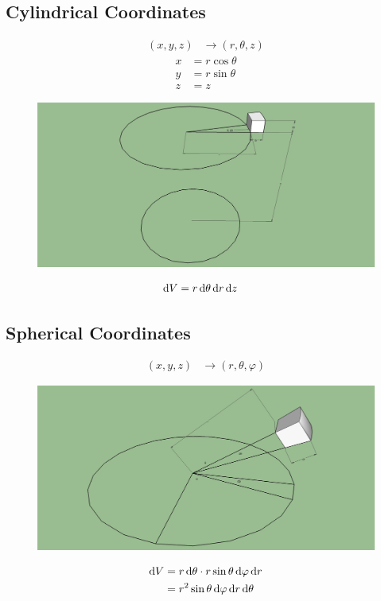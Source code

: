 \documentclass[fleqn, a4paper, 12pt]{amsart}
\theoremstyle{definition}
\theoremstyle{theorem}
\begin{document}
\subsection{Cylindrical Coordinates}

\begin{align*}
	(x, y, z) &\to (r, \theta, z)
\end{align*}
\begin{align*}
	x &= r \cos \theta\\
	y &= r \sin \theta\\
	z &= z
\end{align*}

\begin{figure}[h]
	\includegraphics[width=\textwidth]{CylindricalCoordinates.jpg}
\end{figure}

\begin{align*}
	\dif V &= r \dif \theta \dif r \dif z
\end{align*}

\subsection{Spherical Coordinates}

\begin{align*}
(x, y, z) &\to (r, \theta, \varphi)
\end{align*}

\begin{figure}[h]
	\includegraphics[width=\textwidth]{SphericalCoordinates.jpg}
\end{figure}

\begin{align*}
	\dif V &= r \dif \theta \cdot r \sin \theta \dif \varphi \dif r\\
	&= r^2 \sin \theta \dif \varphi \dif r \dif \theta
\end{align*}
\end{document}
